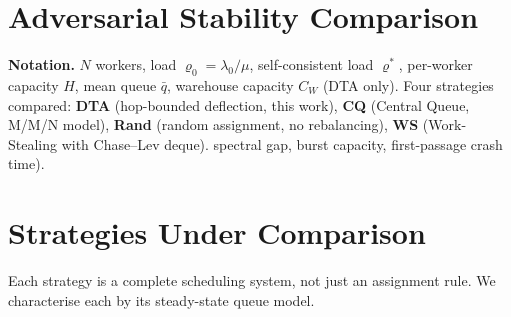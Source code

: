 \documentclass[11pt,a4paper]{article}
\begin{document}

\section*{Adversarial Stability Comparison}
\label{chap:stability_compare}
\setcounter{section}{0}

\textbf{Notation.}
$N$ workers, load $\varrho_0 = \lambda_0/\mu$, self-consistent load $\varrho^*$,
per-worker capacity $H$, mean queue $\bar q$, warehouse capacity $C_W$
(DTA only).
Four strategies compared: \textbf{DTA} (hop-bounded deflection, this work),
\textbf{CQ} (Central Queue, M/M/N model), \textbf{Rand} (random assignment,
no rebalancing), \textbf{WS} (Work-Stealing with Chase--Lev deque).
spectral gap, burst capacity, first-passage crash time).

\section{Strategies Under Comparison}

Each strategy is a complete scheduling system, not just an assignment rule.
We characterise each by its steady-state queue model.
\end{document}
